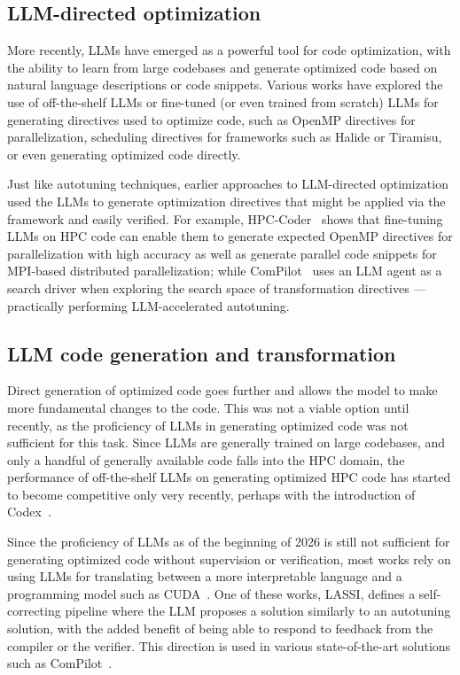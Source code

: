 \subsection{LLM-directed optimization}\label{sec:llm-directed-optimization}

More recently, LLMs have emerged as a powerful tool for code optimization, with the ability to learn from large codebases and generate optimized code based on natural language descriptions or code snippets. Various works have explored the use of off-the-shelf LLMs or fine-tuned (or even trained from scratch) LLMs for generating directives used to optimize code, such as OpenMP directives for parallelization, scheduling directives for frameworks such as Halide or Tiramisu, or even generating optimized code directly.

Just like autotuning techniques, earlier approaches to LLM-directed optimization used the LLMs to generate optimization directives that might be applied via the framework and easily verified. For example, HPC-Coder~\cite{nichols2024hpc} shows that fine-tuning LLMs on HPC code can enable them to generate expected OpenMP directives for parallelization with high accuracy as well as generate parallel code snippets for MPI-based distributed parallelization; while ComPilot~\cite{merouani2025agentic} uses an LLM agent as a search driver when exploring the search space of transformation directives --- practically performing LLM-accelerated autotuning.


\subsection{LLM code generation and transformation}\label{sec:llm-code-generation}

Direct generation of optimized code goes further and allows the model to make more fundamental changes to the code. This was not a viable option until recently, as the proficiency of LLMs in generating optimized code was not sufficient for this task. Since LLMs are generally trained on large codebases, and only a handful of generally available code falls into the HPC domain, the performance of off-the-shelf LLMs on generating optimized HPC code has started to become competitive only very recently, perhaps with the introduction of Codex~\cite{chen2021evaluating}.

Since the proficiency of LLMs as of the beginning of 2026 is still not sufficient for generating optimized code without supervision or verification, most works rely on using LLMs for translating between a more interpretable language and a programming model such as CUDA~\cite{palkowski2024gpt,dearing2024lassi}. One of these works, LASSI, defines a self-correcting pipeline where the LLM proposes a solution similarly to an autotuning solution, with the added benefit of being able to respond to feedback from the compiler or the verifier. This direction is used in various state-of-the-art solutions such as ComPilot~\cite{merouani2025agentic}.


